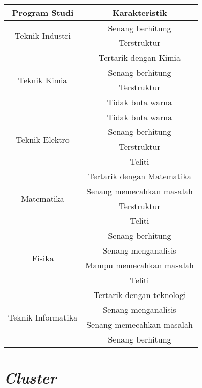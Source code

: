 \begin{table}[H] %
	\centering 
	\label{tab:contoh1}
	\begin{tabular}{| c | c |}
		\hline
		Program Studi & Karakteristik \\		
		
		\hline
		\multirow{2}{10em}{Teknik Industri} &  Senang berhitung \\
		& Terstruktur \\
		
		\hline
		\multirow{4}{10em}{Teknik Kimia} & Tertarik dengan Kimia \\
		& Senang berhitung \\
		& Terstruktur \\
		& Tidak buta warna\\
		
		\hline
		\multirow{4}{10em}{Teknik Elektro} & Tidak buta warna \\
		& Senang berhitung \\
		& Terstruktur \\
		& Teliti \\

		\hline
		\multirow{4}{10em}{Matematika} & Tertarik dengan Matematika \\
		& Senang memecahkan masalah \\
		& Terstruktur \\
		& Teliti \\
		
		\hline
		\multirow{4}{10em}{Fisika} & Senang berhitung \\
		& Senang menganalisis \\
		& Mampu memecahkan masalah\\
		& Teliti \\
		
		\hline
		\multirow{4}{10em}{Teknik Informatika} & Tertarik dengan teknologi \\
		& Senang menganalisis \\
		& Senang memecahkan masalah \\
		& Senang berhitung \\

		\hline
		
	\end{tabular} 
\end{table}

\section{\textit{Cluster}}
\label{sec:cluster}

